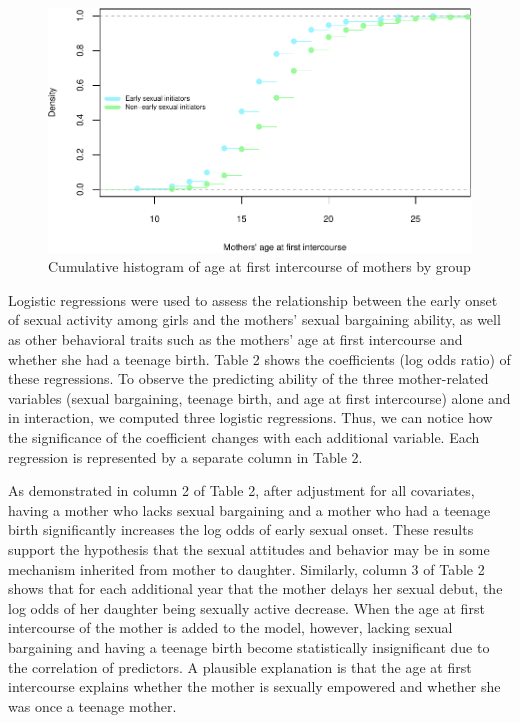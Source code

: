 \documentclass[
]{article}
\begin{document}
\begin{figure}

{\centering \includegraphics[width=0.8\linewidth,height=0.7\textheight]{early_sexual_activity_report_files/figure-latex/unnamed-chunk-3-1} 

}

\caption{Cumulative histogram of age at first intercourse of mothers by group}\label{fig:unnamed-chunk-3}
\end{figure}

Logistic regressions were used to assess the relationship between the
early onset of sexual activity among girls and the mothers' sexual
bargaining ability, as well as other behavioral traits such as the
mothers' age at first intercourse and whether she had a teenage birth.
Table 2 shows the coefficients (log odds ratio) of these regressions. To
observe the predicting ability of the three mother-related variables
(sexual bargaining, teenage birth, and age at first intercourse) alone
and in interaction, we computed three logistic regressions. Thus, we can
notice how the significance of the coefficient changes with each
additional variable. Each regression is represented by a separate column
in Table 2.

As demonstrated in column 2 of Table 2, after adjustment for all
covariates, having a mother who lacks sexual bargaining and a mother who
had a teenage birth significantly increases the log odds of early sexual
onset. These results support the hypothesis that the sexual attitudes
and behavior may be in some mechanism inherited from mother to daughter.
Similarly, column 3 of Table 2 shows that for each additional year that
the mother delays her sexual debut, the log odds of her daughter being
sexually active decrease. When the age at first intercourse of the
mother is added to the model, however, lacking sexual bargaining and
having a teenage birth become statistically insignificant due to the
correlation of predictors. A plausible explanation is that the age at
first intercourse explains whether the mother is sexually empowered and
whether she was once a teenage mother.
\end{document}
